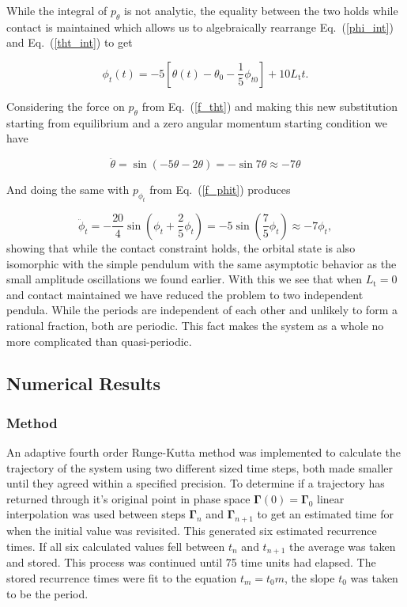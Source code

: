 \documentclass[prbg,preprint]{revtex4-1}
\begin{document}
While the integral of $p_\theta$ is not analytic, the equality between the two holds while contact is maintained which allows us to algebraically rearrange Eq.~(\ref{phi_int}) and Eq.~(\ref{tht_int}) to get

\begin{equation}
	\phi_t(t)=  -5
	\left[
	\theta(t)-\theta_{0}-\frac{1}{5}\phi_{t0}
	\right] 
	+ 10L_\textrm{t} t .
\end{equation}

Considering the force on $p_\theta$ from Eq.~(\ref{f_tht}) and making this new substitution starting from equilibrium and a zero angular momentum starting condition we have

\begin{equation}
	\ddot \theta = \sin(-5\theta -2\theta) = -\sin 7\theta \approx -7\theta
\end{equation}

And doing the same with $p_{\phi_t}$ from Eq.~(\ref{f_phit}) produces

\begin{equation}
	\ddot \phi_t = -\frac{20}{4}\sin(\phi_t +\frac{2}{5}\phi_t) =  -5\sin\left ( \frac{7}{5}\phi_t \right )\approx -7\phi_t,
\end{equation}
showing that while the contact constraint holds, the orbital state is also isomorphic with the simple pendulum with the same asymptotic behavior as the small amplitude oscillations we found earlier. With this we see that when $L_\textrm{t}=0$ and contact maintained we have reduced the problem to two independent pendula. While the periods are independent of each other and unlikely to form a rational fraction, both are periodic. This fact makes the system as a whole no more complicated than quasi-periodic.

\subsection{Numerical Results}
\subsubsection{Method}
An adaptive fourth order Runge-Kutta method was implemented to calculate the trajectory of the system using two different sized time steps, both made smaller until they agreed within a specified precision. To determine if a trajectory has returned through it's original point in phase space $\boldsymbol{\Gamma}(0)=\boldsymbol{\Gamma}_0$ linear interpolation was used between steps $\boldsymbol{\Gamma}_n$ and $\boldsymbol{\Gamma}_{n+1}$ to get an estimated time for when the initial value was revisited. This generated six estimated recurrence times. If all six calculated values fell between $t_n$ and $t_{n+1}$ the average was taken and stored. This process was continued until 75 time units had elapsed. The stored recurrence times were fit to the equation $t_m = t_0m$, the slope $t_0$ was taken to be the period.
\end{document}
